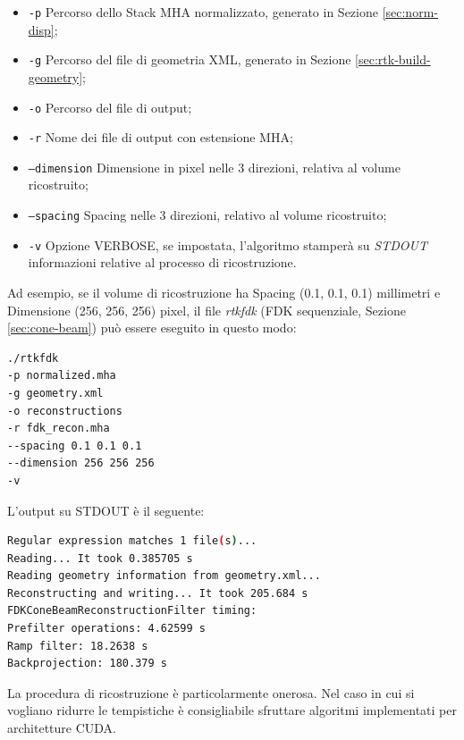\documentclass[a4paper,12pt, doubleside]{report}
\begin{document}
                \begin{itemize}
                    \item \texttt{-p} Percorso dello Stack MHA normalizzato, generato in Sezione \ref{sec:norm-disp};
                    \item \texttt{-g} Percorso del file di geometria XML, generato in Sezione \ref{sec:rtk-build-geometry};
                    \item \texttt{-o} Percorso del file di output;
                    \item \texttt{-r} Nome dei file di output con estensione MHA;
                    \item \texttt{--dimension} Dimensione in pixel nelle 3 direzioni, relativa al volume ricostruito;
                    \item \texttt{--spacing} Spacing nelle 3 direzioni, relativo al volume ricostruito;
                    \item \texttt{-v} Opzione VERBOSE, se impostata, l'algoritmo stamperà su \textit{STDOUT} informazioni relative al processo di ricostruzione.
                \end{itemize}
                
                Ad esempio, se il volume di ricostruzione ha Spacing (0.1, 0.1, 0.1) millimetri e Dimensione (256, 256, 256) pixel, il file \textit{rtkfdk} (FDK sequenziale, Sezione \ref{sec:cone-beam}) può essere eseguito in questo modo:
               
                \begin{lstlisting}[language=bash, frame=bt]
./rtkfdk 
-p normalized.mha
-g geometry.xml 
-o reconstructions
-r fdk_recon.mha
--spacing 0.1 0.1 0.1
--dimension 256 256 256
-v
                \end{lstlisting}
            
                L'output su STDOUT è il seguente:
            
                \begin{lstlisting}[language=bash, frame=bt]
Regular expression matches 1 file(s)...
Reading... It took 0.385705 s
Reading geometry information from geometry.xml...
Reconstructing and writing... It took 205.684 s
FDKConeBeamReconstructionFilter timing:
Prefilter operations: 4.62599 s
Ramp filter: 18.2638 s
Backprojection: 180.379 s
                \end{lstlisting}
                
                La procedura di ricostruzione è particolarmente onerosa. Nel caso in cui si vogliano ridurre le tempistiche è consigliabile sfruttare algoritmi implementati per architetture CUDA.
            
\end{document}
